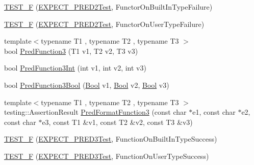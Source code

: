 \begin{DoxyCompactItemize}
\item 
\mbox{\hyperlink{googletest-master_2googletest_2test_2gtest__pred__impl__unittest_8cc_abf5bb7d7ccccca88e88947d21091caf5}{T\+E\+S\+T\+\_\+F}} (\mbox{\hyperlink{googletest-master_2googletest_2test_2gtest__pred__impl__unittest_8cc_a232826190f0ba7ce5dffa1ced1219acc}{E\+X\+P\+E\+C\+T\+\_\+\+P\+R\+E\+D2\+Test}}, Functor\+On\+Built\+In\+Type\+Failure)
\item 
\mbox{\hyperlink{googletest-master_2googletest_2test_2gtest__pred__impl__unittest_8cc_aab4f3bf01d55a7228147db3c959fd830}{T\+E\+S\+T\+\_\+F}} (\mbox{\hyperlink{googletest-master_2googletest_2test_2gtest__pred__impl__unittest_8cc_a232826190f0ba7ce5dffa1ced1219acc}{E\+X\+P\+E\+C\+T\+\_\+\+P\+R\+E\+D2\+Test}}, Functor\+On\+User\+Type\+Failure)
\item 
{\footnotesize template$<$typename T1 , typename T2 , typename T3 $>$ }\\bool \mbox{\hyperlink{googletest-master_2googletest_2test_2gtest__pred__impl__unittest_8cc_a78a1ff258fe5a85da5b2645983311a70}{Pred\+Function3}} (T1 v1, T2 v2, T3 v3)
\item 
bool \mbox{\hyperlink{googletest-master_2googletest_2test_2gtest__pred__impl__unittest_8cc_a31b4c93e469feb1523b6073634c1ca4c}{Pred\+Function3\+Int}} (int v1, int v2, int v3)
\item 
bool \mbox{\hyperlink{googletest-master_2googletest_2test_2gtest__pred__impl__unittest_8cc_afa4ce2143c2ffedb2fa5d5f8cff6f6e6}{Pred\+Function3\+Bool}} (\mbox{\hyperlink{struct_bool}{Bool}} v1, \mbox{\hyperlink{struct_bool}{Bool}} v2, \mbox{\hyperlink{struct_bool}{Bool}} v3)
\item 
{\footnotesize template$<$typename T1 , typename T2 , typename T3 $>$ }\\testing\+::\+Assertion\+Result \mbox{\hyperlink{googletest-master_2googletest_2test_2gtest__pred__impl__unittest_8cc_abddc62e1faf4d19992a0acb69577e0f3}{Pred\+Format\+Function3}} (const char $\ast$e1, const char $\ast$e2, const char $\ast$e3, const T1 \&v1, const T2 \&v2, const T3 \&v3)
\item 
\mbox{\hyperlink{googletest-master_2googletest_2test_2gtest__pred__impl__unittest_8cc_a6f0143d40175fd8e84aba9b52e16f3fc}{T\+E\+S\+T\+\_\+F}} (\mbox{\hyperlink{googletest-master_2googletest_2test_2gtest__pred__impl__unittest_8cc_a15eb53ab3f302d7bfffe1352f3902eb4}{E\+X\+P\+E\+C\+T\+\_\+\+P\+R\+E\+D3\+Test}}, Function\+On\+Built\+In\+Type\+Success)
\item 
\mbox{\hyperlink{googletest-master_2googletest_2test_2gtest__pred__impl__unittest_8cc_a509632492410e91aa0d85ff1cdeaf1cc}{T\+E\+S\+T\+\_\+F}} (\mbox{\hyperlink{googletest-master_2googletest_2test_2gtest__pred__impl__unittest_8cc_a15eb53ab3f302d7bfffe1352f3902eb4}{E\+X\+P\+E\+C\+T\+\_\+\+P\+R\+E\+D3\+Test}}, Function\+On\+User\+Type\+Success)

\end{DoxyCompactItemize}
